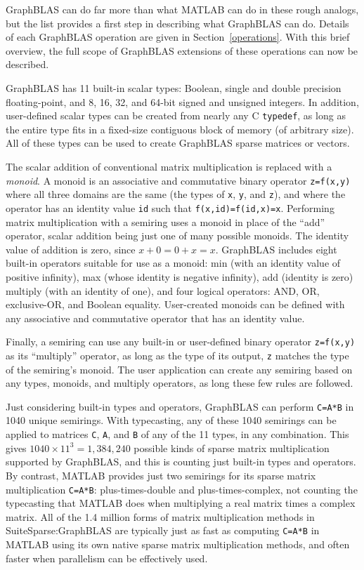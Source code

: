 \documentclass[12pt]{article}
\begin{document}
GraphBLAS can do far more than what MATLAB can do in these rough analogs, but
the list provides a first step in describing what GraphBLAS can do.  Details of
each GraphBLAS operation are given in Section~\ref{operations}.  With this
brief overview, the full scope of GraphBLAS extensions of these operations can
now be described.

GraphBLAS has 11 built-in scalar types: Boolean, single and double precision
floating-point, and 8, 16, 32, and 64-bit signed and unsigned integers.  In
addition, user-defined scalar types can be created from nearly any C
\verb'typedef', as long as the entire type fits in a fixed-size contiguous
block of memory (of arbitrary size).  All of these types can be used to create
GraphBLAS sparse matrices or vectors.

The scalar addition of conventional matrix multiplication is replaced with a
{\em monoid}.  A monoid is an associative and commutative binary operator
\verb'z=f(x,y)' where all three domains are the same (the types of \verb'x',
\verb'y', and \verb'z'), and where the operator has an identity value \verb'id'
such that \verb'f(x,id)=f(id,x)=x'.  Performing matrix multiplication with a
semiring uses a monoid in place of the ``add'' operator, scalar addition being
just one of many possible monoids.  The identity value of addition is zero,
since $x+0=0+x=x$.   GraphBLAS includes eight built-in operators suitable for
use as a monoid: min (with an identity value of positive infinity), max (whose
identity is negative infinity), add (identity is zero) multiply (with an
identity of one), and four logical operators: AND, OR, exclusive-OR, and
Boolean equality.  User-created monoids can be defined with any associative and
commutative operator that has an identity value.

Finally, a semiring can use any built-in or user-defined binary operator
\verb'z=f(x,y)' as its ``multiply'' operator, as long as the type of its
output, \verb'z' matches the type of the semiring's monoid.
The user application can create any semiring based on any types, monoids,
and multiply operators, as long these few rules are followed.

Just considering built-in types and operators, GraphBLAS can perform
\verb'C=A*B' in 1040 unique semirings.  With typecasting, any of these 1040
semirings can be applied to matrices \verb'C', \verb'A', and \verb'B' of any of
the 11 types, in any combination.  This gives $1040 \times 11^3 = 1,384,240$
possible kinds of sparse matrix multiplication supported by GraphBLAS, and this
is counting just built-in types and operators.  By contrast, MATLAB provides
just two semirings for its sparse matrix multiplication \verb'C=A*B':
plus-times-double and plus-times-complex, not counting the typecasting that
MATLAB does when multiplying a real matrix times a complex matrix.  All of the
1.4 million forms of matrix multiplication methods in SuiteSparse:GraphBLAS are
typically just as fast as computing \verb'C=A*B' in MATLAB using its own native
sparse matrix multiplication methods, and often faster when parallelism can
be effectively used.
\end{document}
